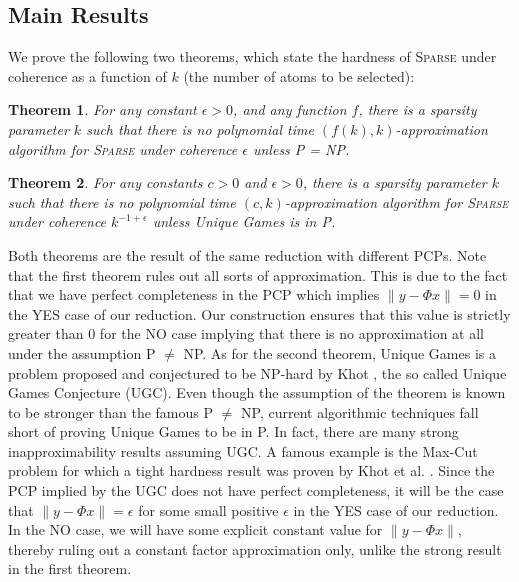 \documentclass[11pt]{article}
\newtheorem{thm}{Theorem}[section]
\begin{document}

\subsection{Main Results}
We prove the following two theorems, which state the hardness
of \textsc{Sparse} under coherence as a function of $k$
(the number of atoms to be selected):

\begin{thm}
\label{thm_a} For any constant $\epsilon > 0$, and any function $f$, there is
a sparsity parameter $k$ such that there is no polynomial time $(f(k),k)$-approximation
algorithm for \textsc{Sparse} under coherence $\epsilon$ unless \textsf{P} = \textsf{NP}.
\end{thm}

\begin{thm}
\label{thm_b} For any constants $c > 0$ and $\epsilon > 0$, there is
a sparsity parameter $k$ such that there is no polynomial time $(c,k)$-approximation
algorithm for \textsc{Sparse} under coherence
$k^{-1+\epsilon}$ unless Unique Games is in \textsf{P}.
\end{thm}

Both theorems are the result of the same reduction with
different PCPs. Note that the first theorem rules out all
sorts of approximation. This is due to the fact that we
have perfect completeness in the PCP which implies
$\|y-\Phi x\|=0$ in the YES case of our reduction. Our
construction ensures that this value is strictly greater
than $0$ for the NO case implying that there is no
approximation at all under the assumption \textsf{P} $\neq$ \textsf{NP}.
As for the second theorem, Unique Games is
a problem proposed and conjectured to be \textsf{NP}-hard by Khot
\cite{Khot-UGC}, the so called Unique Games Conjecture
(UGC). Even though the assumption of the theorem is known
to be stronger than the famous \textsf{P} $\neq$ \textsf{NP}, current
algorithmic techniques fall short of proving Unique Games
to be in \textsf{P}. In fact, there are many strong inapproximability
results assuming UGC. A famous example is the Max-Cut problem for
which a tight hardness result was proven by Khot et al.
\cite{Khot-Maxcut}. Since the PCP implied by the UGC
does not have perfect completeness, it will be the case
that $\|y-\Phi x\|=\epsilon$ for some small positive
$\epsilon$ in the YES case of our reduction. In the NO
case, we will have some explicit constant value for
$\|y-\Phi x\|$, thereby ruling out a constant factor
approximation only, unlike the strong result in the
first theorem.
\end{document}

